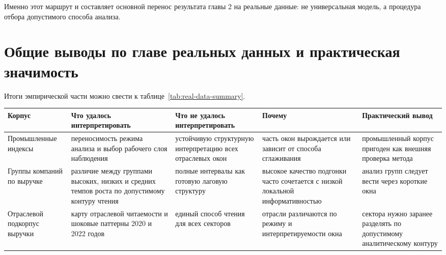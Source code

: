 Именно этот маршрут и составляет основной перенос результата главы 2 на реальные данные: не универсальная модель, а процедура отбора допустимого способа анализа.

\section{Общие выводы по главе реальных данных и практическая значимость}
\label{sec:obschie-vyvody-po-glave-realnyh-dannyh-i-prakticheskaya-znachimost}

Итоги эмпирической части можно свести к таблице~\ref{tab:real-data-summary}.

\begin{center}
\label{tab:real-data-summary}
\end{center}

{\def\LTcaptype{none} %
\begin{longtable}[]{@{}
  >{\raggedright\arraybackslash}p{}
  >{\raggedright\arraybackslash}p{}
  >{\raggedright\arraybackslash}p{}
  >{\raggedright\arraybackslash}p{}
  >{\raggedright\arraybackslash}p{}@{}}
\toprule\noalign{}
\begin{minipage}[b]{\linewidth}\raggedright
Корпус
\end{minipage} & \begin{minipage}[b]{\linewidth}\raggedright
Что удалось интерпретировать
\end{minipage} & \begin{minipage}[b]{\linewidth}\raggedright
Что не удалось интерпретировать
\end{minipage} & \begin{minipage}[b]{\linewidth}\raggedright
Почему
\end{minipage} & \begin{minipage}[b]{\linewidth}\raggedright
Практический вывод
\end{minipage} \\
\midrule\noalign{}
\endhead
\bottomrule\noalign{}
\endlastfoot
Промышленные индексы & переносимость режима анализа и выбор рабочего слоя наблюдения & устойчивую структурную интерпретацию всех отраслевых окон & часть окон вырождается или зависит от способа сглаживания & промышленный корпус пригоден как внешняя проверка метода \\
Группы компаний по выручке & различие между группами высоких, низких и средних темпов роста по допустимому контуру чтения & полные интервалы как готовую лаговую структуру & высокое качество подгонки часто сочетается с низкой локальной информативностью & анализ групп следует вести через короткие окна \\
Отраслевой подкорпус выручки & карту отраслевой читаемости и шоковые паттерны 2020 и 2022 годов & единый способ чтения для всех секторов & отрасли различаются по режиму и интерпретируемости окна & сектора нужно заранее разделять по допустимому аналитическому контуру \\
\end{longtable}
}


